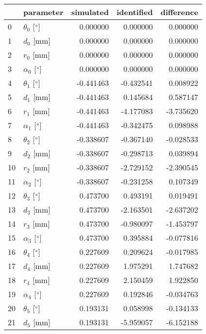 \documentclass{standalone}%
\begin{document}
%
\normalsize%
\begin{tabular}{llrrr}
\toprule
{} &                 parameter & simulated & identified & difference \\
\midrule
0  &  $\theta_{0}$ [$\degree$] &  0.000000 &   0.000000 &   0.000000 \\
1  &              $d_{0}$ [mm] &  0.000000 &   0.000000 &   0.000000 \\
2  &              $r_{0}$ [mm] &  0.000000 &   0.000000 &   0.000000 \\
3  &  $\alpha_{0}$ [$\degree$] &  0.000000 &   0.000000 &   0.000000 \\
4  &  $\theta_{1}$ [$\degree$] & -0.441463 &  -0.432541 &   0.008922 \\
5  &              $d_{1}$ [mm] & -0.441463 &   0.145684 &   0.587147 \\
6  &              $r_{1}$ [mm] & -0.441463 &  -4.177083 &  -3.735620 \\
7  &  $\alpha_{1}$ [$\degree$] & -0.441463 &  -0.342475 &   0.098988 \\
8  &  $\theta_{2}$ [$\degree$] & -0.338607 &  -0.367140 &  -0.028533 \\
9  &              $d_{2}$ [mm] & -0.338607 &  -0.298713 &   0.039894 \\
10 &              $r_{2}$ [mm] & -0.338607 &  -2.729152 &  -2.390545 \\
11 &  $\alpha_{2}$ [$\degree$] & -0.338607 &  -0.231258 &   0.107349 \\
12 &  $\theta_{3}$ [$\degree$] &  0.473700 &   0.493191 &   0.019491 \\
13 &              $d_{3}$ [mm] &  0.473700 &  -2.163501 &  -2.637202 \\
14 &              $r_{3}$ [mm] &  0.473700 &  -0.980097 &  -1.453797 \\
15 &  $\alpha_{3}$ [$\degree$] &  0.473700 &   0.395884 &  -0.077816 \\
16 &  $\theta_{4}$ [$\degree$] &  0.227609 &   0.209624 &  -0.017985 \\
17 &              $d_{4}$ [mm] &  0.227609 &   1.975291 &   1.747682 \\
18 &              $r_{4}$ [mm] &  0.227609 &   2.150459 &   1.922850 \\
19 &  $\alpha_{4}$ [$\degree$] &  0.227609 &   0.192846 &  -0.034763 \\
20 &  $\theta_{5}$ [$\degree$] &  0.193131 &   0.058998 &  -0.134133 \\
21 &              $d_{5}$ [mm] &  0.193131 &  -5.959057 &  -6.152188 \\

\end{tabular}
\end{document}
